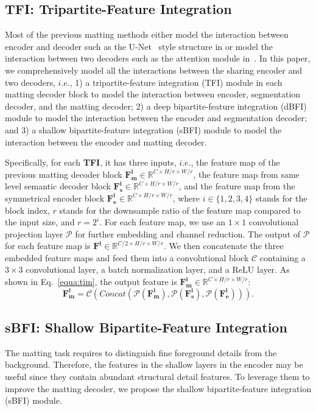 \documentclass[sigconf]{acmart}
\begin{document}
\subsection{TFI: Tripartite-Feature Integration}
\label{sec:tim}
Most of the previous matting methods either model the interaction between encoder and decoder such as the U-Net~\cite{unet} style structure in \cite{gfm} or model the interaction between two decoders such as the attention module in~\cite{hatt}. In this paper, we comprehensively model all the interactions between the sharing encoder and two decoders, $i.e.$, 1) a tripartite-feature integration (TFI) module in each matting decoder block to model the interaction between encoder, segmentation decoder, and the matting decoder; 2) a deep bipartite-feature integration (dBFI) module to model the interaction between the encoder and segmentation decoder; and 3) a shallow bipartite-feature integration (sBFI) module to model the interaction between the encoder and matting decoder.

Specifically, for each \textbf{TFI}, it has three inputs, $i.e.$, the feature map of the previous matting decoder block $\mathbf{F_m^i} \in \mathbb{R}^{C\times H/r \times W/r}$, the feature map from same level semantic decoder block $\mathbf{F_s^i} \in \mathbb{R}^{C\times H/r \times W/r}$, and the feature map from the symmetrical encoder block $\mathbf{F_e^i} \in \mathbb{R}^{C\times H/r \times W/r}$, where $i\in \{1,2,3,4\}$ stands for the block index, $r$ stands for the downsample ratio of the feature map compared to the input size, and $r=2^i$. For each feature map, we use an $1\times1$ convolutional projection layer $\mathcal{P}$ for further embedding and channel reduction. The output of $\mathcal{P}$ for each feature map is $\mathbf{F^i} \in \mathbb{R}^{C/2\times H/r \times W/r}$. We then concatenate the three embedded feature maps and feed them into a convolutional block $\mathcal{C}$ containing a
$3\times3$ convolutional layer, a batch normalization layer, and a ReLU layer. As shown in Eq.~\ref{equa:tim}, the output feature is $\mathbf{F_m^i}\in\mathbb{R}^{C\times H/r \times W/r}$:
\begin{equation}
\mathbf{F_m^i} = \mathcal{C}(Concat(\mathcal{P}(\mathbf{F^i_m}),\mathcal{P}(\mathbf{F^i_s}),\mathcal{P}(\mathbf{F^i_e}))).
\label{equa:tim}
\end{equation}

\subsection{sBFI: Shallow Bipartite-Feature Integration}
The matting task requires to distinguish fine foreground details from the background. Therefore, the features in the shallow layers in the encoder may be useful since they contain abundant structural detail features. To leverage them to improve the matting decoder, we propose the shallow bipartite-feature integration (sBFI) module.
\end{document}
